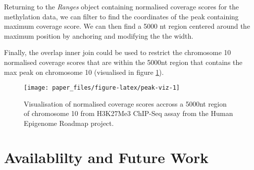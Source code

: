 \documentclass[10pt,letterpaper]{article}
\newenvironment{Shaded}{\begin{snugshade}}{\end{snugshade}}
\newcommand{\KeywordTok}[1]{\textcolor[rgb]{0.13,0.29,0.53}{\textbf{#1}}}
\newcommand{\DecValTok}[1]{\textcolor[rgb]{0.00,0.00,0.81}{#1}}
\newcommand{\StringTok}[1]{\textcolor[rgb]{0.31,0.60,0.02}{#1}}
\newcommand{\OperatorTok}[1]{\textcolor[rgb]{0.81,0.36,0.00}{\textbf{#1}}}
\newcommand{\NormalTok}[1]{#1}
\begin{document}
Returning to the \emph{Ranges} object containing normalised coverage
scores for the methylation data, we can filter to find the coordinates
of the peak containing maximum coverage score. We can then find a 5000
nt region centered around the maximum position by anchoring and
modifying the the width.

\begin{Shaded}
\end{Shaded}

Finally, the overlap inner join could be used to restrict the chromosome
10 normalised coverage scores that are within the 5000nt region that
contains the max peak on chromosome 10 (visualised in figure
\ref{fig:peak-viz}).

\begin{Shaded}
\end{Shaded}

\begin{figure}

{\centering \texttt{[image: paper\_files/figure-latex/peak-viz-1]} 

}

\caption{Visualisation of normalised coverage scores accross a 5000nt region of chromosome 10 from H3K27Me3 ChIP-Seq assay from the Human Epigenome Roadmap project.}\label{fig:peak-viz}
\end{figure}

\section{Availablilty and Future
Work}\label{availablilty-and-future-work}
\end{document}
